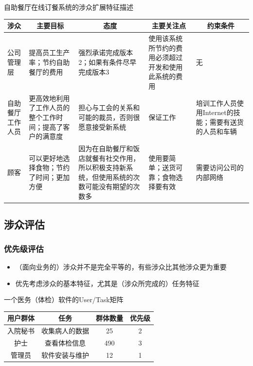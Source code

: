 自助餐厅在线订餐系统的涉众扩展特征描述
\vspace{-0.8em}
\begin{center}
    \begin{longtable}{|m{2cm}<{\centering}|m{2.4cm}|m{2.4cm}|m{2.4cm}|m{2.4cm}|}
    \hline
    涉众       & \multicolumn{1}{c|}{主要目标}                         & \multicolumn{1}{c|}{态度}                                             & \multicolumn{1}{c|}{主要关注点}                      & \multicolumn{1}{c|}{约束条件}                            \\ \hline
    公司管理层    & 提高员工生产率；节约自助餐厅的费用            & 强烈承诺完成版本2；如果有条件尽早完成版本3                         & 使用该系统所节约的费用必须超过开发和使用此系统的费用 & 无                               \\ \hline
    自助餐厅工作人员 & 更高效地利用了工作人员的整个工作时间；提高了客户的满意度 & 担心与工会的关系和可能的裁员，否则很愿意接受新系统                      & 保证工作                       & 培训工作人员使用Internet的技能；需要有送货的人员和车辆 \\ \hline
    顾客       & 可以更好地选择食物；节约了时间；更加方便         & 因为在自助餐厅和饭店就餐有社交作用，所以积极支持新系统，但使用系统的次数可能没有期望的次数多 & 使用要简单；送货可靠；食物选择要有效         & 需要访问公司的内部网络                     \\ \hline
\end{longtable}
\end{center}
\vspace{-3.7em}

\subsection{涉众评估}

\subsubsection{优先级评估}
\begin{itemize}
    \item （面向业务的）涉众并不是完全平等的，有些涉众比其他涉众更为重要
    \item 优先考虑涉众的基本特征，尤其是（涉众所完成的）任务特征 
\end{itemize}

一个医务（体检）软件的User/Task矩阵
\begin{table}[H]
    \centering
    \begin{tabular}{|c|c|c|c|}
    \hline
    用户群体 & 任务      & 群体数量 & 优先级 \\ \hline
    入院秘书 & 收集病人的数据 & 25   & 2   \\ \hline
    护士   & 查看体检信息  & 490  & 3   \\ \hline
    管理员  & 软件安装与维护 & 12   & 1   \\ \hline
    \end{tabular}
\end{table}


